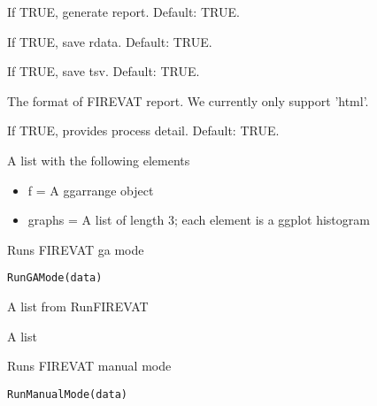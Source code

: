 \documentclass[letterpaper]{book}
\begin{document}
\begin{Arguments}
\begin{ldescription}
\item[\code{report}] If TRUE, generate report. Default: TRUE.

\item[\code{save.rdata}] If TRUE, save rdata. Default: TRUE.

\item[\code{save.tsv}] If TRUE, save tsv. Default: TRUE.

\item[\code{report.format}] The format of FIREVAT report. We currently only support 'html'.

\item[\code{verbose}] If TRUE, provides process detail. Default: TRUE.
\end{ldescription}
\end{Arguments}
%
\begin{Value}
A list with the following elements
\begin{itemize}

\item{} f = A ggarrange object
\item{} graphs = A list of length 3; each element is a ggplot histogram

\end{itemize}

\end{Value}
%
\begin{Description}\relax
Runs FIREVAT ga mode
\end{Description}
%
\begin{Usage}
\begin{verbatim}
RunGAMode(data)
\end{verbatim}
\end{Usage}
%
\begin{Arguments}
\begin{ldescription}
\item[\code{data}] A list from RunFIREVAT
\end{ldescription}
\end{Arguments}
%
\begin{Value}
A list
\end{Value}
%
\begin{Description}\relax
Runs FIREVAT manual mode
\end{Description}
%
\begin{Usage}
\begin{verbatim}
RunManualMode(data)
\end{verbatim}
\end{Usage}
\end{document}
